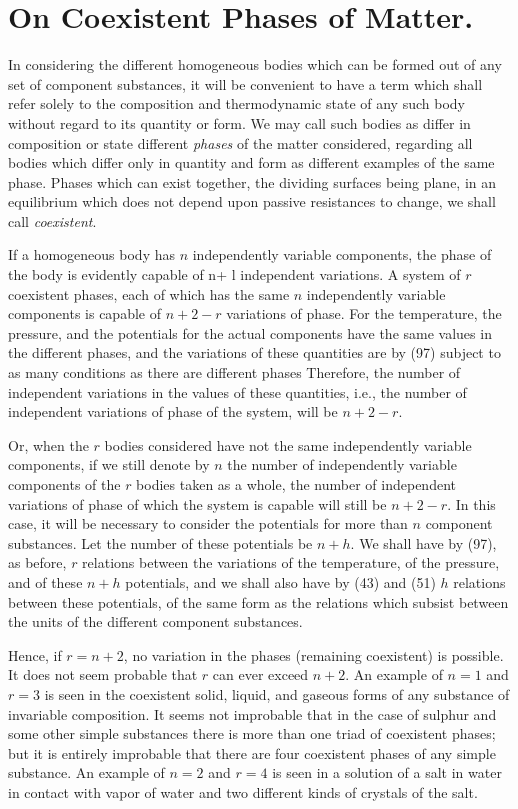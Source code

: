 \documentclass[12pt]{article}
\begin{document}
\section{On Coexistent Phases of Matter.}
In considering the different homogeneous bodies which can be formed out of any set of component substances, it will be convenient to have a term which shall refer solely to the composition and thermodynamic state of any such body without regard to its quantity or form. We may call such bodies as differ in composition or state different \textit{phases} of the matter considered, regarding all bodies which differ only in quantity and form as different examples of the same phase. Phases which can exist together, the dividing surfaces being plane, in an equilibrium which does not depend upon passive resistances to change, we shall call \textit{coexistent}.


If a homogeneous body has $n$ independently variable components, the phase of the body is evidently capable of n+ l independent variations. A system of $r$ coexistent phases, each of which has the same $n$ independently variable components is capable of $n+2-r$ variations of phase. For the temperature, the pressure, and the potentials for the actual components have the same values in the different phases, and the variations of these quantities are by (97) subject to as many conditions as there are different phases Therefore, the number of independent variations in the values of these quantities, i.e., the number of independent variations of phase of the system, will be $n+2-r$.


Or, when the $r$ bodies considered have not the same independently variable components, if we still denote by $n$ the number of independently variable components of the $r$ bodies taken as a whole, the number of independent variations of phase of which the system is capable will still be $n+2-r$. In this case, it will be necessary to consider the potentials for more than $n$ component substances. Let the number of these potentials be $n+h$. We shall have by (97), as before, $r$ relations between the variations of the temperature, of the pressure, and of these $n+h$ potentials, and we shall also have by (43) and (51) $h$ relations between these potentials, of the same form as the relations which subsist between the units of the different component substances.


Hence, if $r=n+2$, no variation in the phases (remaining coexistent) is possible. It does not seem probable that $r$ can ever exceed $n+ 2$. An example of $n=1$ and $r=3$ is seen in the coexistent solid, liquid, and gaseous forms of any substance of invariable composition. It seems not improbable that in the case of sulphur and some other simple substances there is more than one triad of coexistent phases; but it is entirely improbable that there are four coexistent phases of any simple substance. An example of $n=2$ and $r = 4$ is seen in a solution of a salt in water in contact with vapor of water and two different kinds of crystals of the salt.
\end{document}
